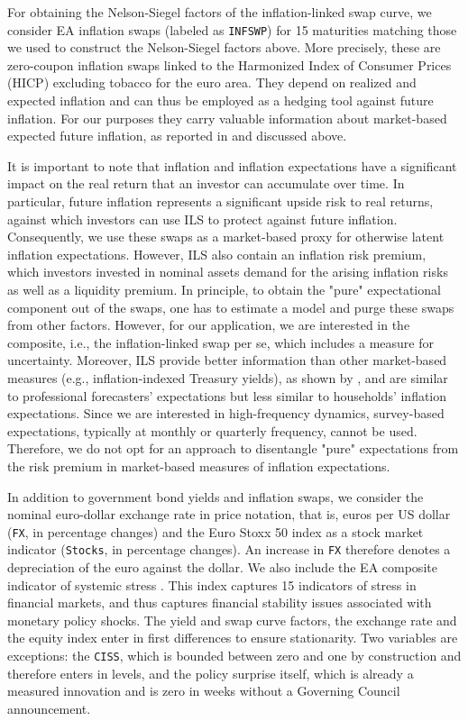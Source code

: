 For obtaining the Nelson-Siegel factors of the inflation-linked swap curve, we consider EA inflation swaps (labeled as \texttt{INFSWP}) for 15 maturities matching those we used to construct the Nelson-Siegel factors above. More precisely, these are zero-coupon inflation swaps linked to the Harmonized Index of Consumer Prices (HICP) excluding tobacco for the euro area. They depend on realized and expected inflation and can thus be employed as a hedging tool against future inflation. For our purposes they carry valuable information about market-based expected future inflation, as reported in \cite{boraugan2020term} and discussed above. 

It is important to note that inflation and inflation expectations have a significant impact on the real return that an investor can accumulate over time. In particular, future inflation represents a significant upside risk to real returns, against which investors can use ILS to protect against future inflation. Consequently, we use these swaps as a market-based proxy for otherwise latent inflation expectations. However, ILS also contain an inflation risk premium, which investors invested in nominal assets demand for the arising inflation risks as well as a liquidity premium. In principle, to obtain the "pure" expectational component out of the swaps, one has to estimate a model and purge these swaps from other factors. However, for our application, we are interested in the composite, i.e., the inflation-linked swap per se, which includes a measure for uncertainty.  Moreover, ILS provide better information than other market-based measures (e.g., inflation-indexed Treasury yields), as shown by \citet{haubrich2012swaps}, and are similar to professional forecasters' expectations but less similar to households' inflation expectations. Since we are interested in high-frequency dynamics, survey-based expectations, typically at monthly or quarterly frequency, cannot be used. Therefore, we do not opt for an approach to disentangle "pure" expectations from the risk premium in market-based measures of inflation expectations. 



In addition to government bond yields and inflation swaps, we consider the nominal euro-dollar exchange rate in price notation, that is, euros per US dollar (\texttt{FX}, in percentage changes) and the Euro Stoxx 50 index as a stock market indicator (\texttt{Stocks}, in percentage changes). An increase in \texttt{FX} therefore denotes a depreciation of the euro against the dollar. We also include the EA composite indicator of systemic stress \citep[\texttt{CISS},][]{kremer2012CISS}. This index captures 15 indicators of stress in financial markets, and thus captures financial stability issues associated with monetary policy shocks. The yield and swap curve factors, the exchange rate and the equity index enter in first differences to ensure stationarity. Two variables are exceptions: the \texttt{CISS}, which is bounded between zero and one by construction and therefore enters in levels, and the policy surprise itself, which is already a measured innovation and is zero in weeks without a Governing Council announcement. 



